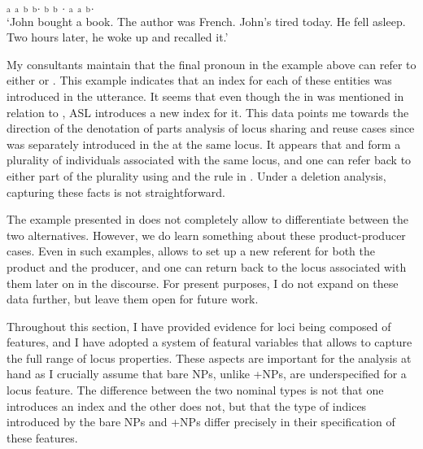 \documentclass[output=paper,
modfonts
]{langscibook}
\begin{document}
\begin{exe}  
	\ex \label{ex:irani:82} $_\text{a}$ $_\text{a}$  $_\text{b}$ $_\text{b}$. $_\text{b}$ $_\text{b}$ . $_\text{a}$ $_\text{a}$  $_\text{b}$. \\
	`John bought a book. The author was French. John's tired today. He fell asleep. Two hours later, he woke up and recalled it.'
\end{exe} 

My consultants maintain that the final pronoun  in the example above can refer to either  or . This example indicates that an index for each of these entities was introduced in the utterance. It seems that even though the  in  was mentioned in relation to , ASL introduces a new index for it. This data points me towards the direction of the denotation of parts analysis of locus sharing and reuse cases since  was separately introduced in the  at the same locus. It appears that  and  form a plurality of individuals associated with the same locus, and one can refer back to either part of the plurality using  and the rule in . Under a deletion analysis, capturing these facts is not straightforward. 

The example presented in  does not completely allow to differentiate between the two alternatives. However, we do learn something about these product-producer  cases. Even in such examples,  allows to set up a new referent for both the product and the producer, and one can return back to the locus associated with them later on in the discourse. For present purposes, I do not expand on these data further, but leave them open for future work. 

Throughout this section, I have provided evidence for loci being composed of features, and I have adopted a system of featural variables that allows to capture the full range of locus properties. These aspects are important for the analysis at hand as I crucially assume that bare NPs, unlike +NPs, are underspecified for a locus feature. The difference between the two nominal types is not that one introduces an index and the other does not, but that the type of indices introduced by the bare NPs and +NPs differ precisely in their specification of these features. 
\end{document}
